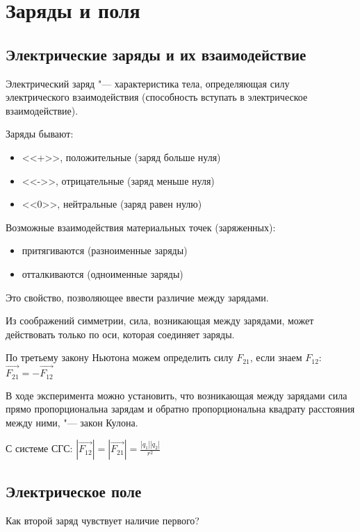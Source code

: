 \chapter{Заряды и поля}

\section{Электрические заряды и их взаимодействие}

\begin{Def}
Электрический заряд "--- характеристика тела, определяющая силу электрического взаимодействия (способность вступать в электрическое взаимодействие).
\end{Def}

Заряды бывают:
\begin{itemize}
\item <<+>>, положительные (заряд больше нуля)
\item <<->>, отрицательные (заряд меньше нуля)
\item <<0>>, нейтральные   (заряд равен нулю)
\end{itemize}

Возможные взаимодействия материальных точек (заряженных):
\begin{itemize}
\item притягиваются (разноименные заряды)
\item отталкиваются (одноименные заряды)
\end{itemize}
Это свойство, позволяющее ввести различие между зарядами.

Из соображений симметрии, сила, возникающая между зарядами, может действовать только по оси, которая соединяет заряды.

По третьему закону Ньютона можем определить силу $F_21$, если знаем $F_12$: $\overrightarrow{F_21} = - \overrightarrow{F_12}$

В ходе эксперимента можно установить, что возникающая между зарядами сила прямо пропорциональна зарядам и обратно пропорциональна квадрату расстояния между ними, "--- закон Кулона.

С системе СГС: $|\overrightarrow{F_12} | = |\overrightarrow{F_21}| = \frac{|q_1||q_2|}{r^2}$

\section{Электрическое поле}
Как второй заряд чувствует наличие первого?

